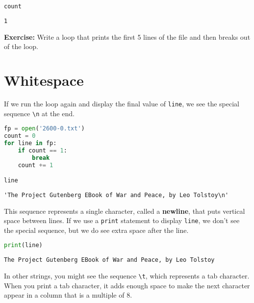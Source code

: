 \begin{lstlisting}[language=Python,style=source]
count
\end{lstlisting}

\begin{lstlisting}[style=output]
1
\end{lstlisting}

\textbf{Exercise:} Write a loop that prints the first 5 lines of the
file and then breaks out of the loop.

\hypertarget{whitespace}{%
\section{Whitespace}\label{whitespace}}

If we run the loop again and display the final value of
\passthrough{\lstinline!line!}, we see the special sequence
\passthrough{\lstinline!\\n!} at the end.

\begin{lstlisting}[language=Python,style=source]
fp = open('2600-0.txt')
count = 0
for line in fp:
    if count == 1:
        break
    count += 1

line
\end{lstlisting}

\begin{lstlisting}[style=output]
'The Project Gutenberg EBook of War and Peace, by Leo Tolstoy\n'
\end{lstlisting}

This sequence represents a single character, called a \textbf{newline},
that puts vertical space between lines. If we use a
\passthrough{\lstinline!print!} statement to display
\passthrough{\lstinline!line!}, we don't see the special sequence, but
we do see extra space after the line.

\begin{lstlisting}[language=Python,style=source]
print(line)
\end{lstlisting}

\begin{lstlisting}[style=output]
The Project Gutenberg EBook of War and Peace, by Leo Tolstoy
\end{lstlisting}

In other strings, you might see the sequence
\passthrough{\lstinline!\\t!}, which represents a tab character. When
you print a tab character, it adds enough space to make the next
character appear in a column that is a multiple of 8.


